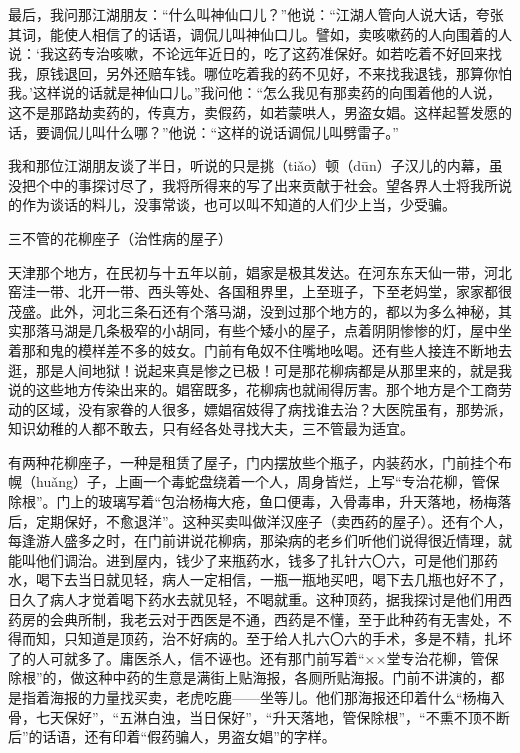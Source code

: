 \documentclass[12pt,UTF8]{ctexbook}
\begin{document}
最后，我问那江湖朋友：“什么叫神仙口儿？”他说：“江湖人管向人说大话，夸张其词，能使人相信了的话语，调侃儿叫神仙口儿。譬如，卖咳嗽药的人向围着的人说：‘我这药专治咳嗽，不论远年近日的，吃了这药准保好。如若吃着不好回来找我，原钱退回，另外还赔车钱。哪位吃着我的药不见好，不来找我退钱，那算你怕我。’这样说的话就是神仙口儿。”我问他：“怎么我见有那卖药的向围着他的人说，这不是那路劫卖药的，传真方，卖假药，如若蒙哄人，男盗女娼。这样起誓发愿的话，要调侃儿叫什么哪？”他说：“这样的说话调侃儿叫劈雷子。”

我和那位江湖朋友谈了半日，听说的只是挑（tiǎo）顿（dūn）子汉儿的内幕，虽没把个中的事探讨尽了，我将所得来的写了出来贡献于社会。望各界人士将我所说的作为谈话的料儿，没事常谈，也可以叫不知道的人们少上当，少受骗。





三不管的花柳座子（治性病的屋子）


天津那个地方，在民初与十五年以前，娼家是极其发达。在河东东天仙一带，河北窑洼一带、北开一带、西头等处、各国租界里，上至班子，下至老妈堂，家家都很茂盛。此外，河北三条石还有个落马湖，没到过那个地方的，都以为多么神秘，其实那落马湖是几条极窄的小胡同，有些个矮小的屋子，点着阴阴惨惨的灯，屋中坐着那和鬼的模样差不多的妓女。门前有龟奴不住嘴地吆喝。还有些人接连不断地去逛，那是人间地狱！说起来真是惨之已极！可是那花柳病都是从那里来的，就是我说的这些地方传染出来的。娼窑既多，花柳病也就闹得厉害。那个地方是个工商劳动的区域，没有家眷的人很多，嫖娼宿妓得了病找谁去治？大医院虽有，那势派，知识幼稚的人都不敢去，只有经各处寻找大夫，三不管最为适宜。

有两种花柳座子，一种是租赁了屋子，门内摆放些个瓶子，内装药水，门前挂个布幌（huǎng）子，上画一个毒蛇盘绕着一个人，周身皆烂，上写“专治花柳，管保除根”。门上的玻璃写着“包治杨梅大疮，鱼口便毒，入骨毒串，升天落地，杨梅落后，定期保好，不愈退洋”。这种买卖叫做洋汉座子（卖西药的屋子）。还有个人，每逢游人盛多之时，在门前讲说花柳病，那染病的老乡们听他们说得很近情理，就能叫他们调治。进到屋内，钱少了来瓶药水，钱多了扎针六〇六，可是他们那药水，喝下去当日就见轻，病人一定相信，一瓶一瓶地买吧，喝下去几瓶也好不了，日久了病人才觉着喝下药水去就见轻，不喝就重。这种顶药，据我探讨是他们用西药房的会典所制，我老云对于西医是不通，西药是不懂，至于此种药有无害处，不得而知，只知道是顶药，治不好病的。至于给人扎六〇六的手术，多是不精，扎坏了的人可就多了。庸医杀人，信不诬也。还有那门前写着“××堂专治花柳，管保除根”的，做这种中药的生意是满街上贴海报，各厕所贴海报。门前不讲演的，都是指着海报的力量找买卖，老虎吃鹿——坐等儿。他们那海报还印着什么“杨梅入骨，七天保好”，“五淋白浊，当日保好”，“升天落地，管保除根”，“不熏不顶不断后”的话语，还有印着“假药骗人，男盗女娼”的字样。
\end{document}
